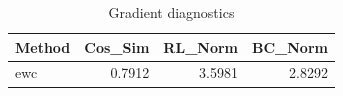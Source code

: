 \begin{table}[htbp]
\centering
\caption{Gradient diagnostics}
\label{tab:grad-diag}
\begin{tabular}{lrrr}
\toprule
\textbf{Method} & \textbf{Cos\_Sim} & \textbf{RL\_Norm} & \textbf{BC\_Norm} \\
\midrule
ewc & 0.7912 & 3.5981 & 2.8292 \\
\bottomrule
\end{tabular}
\end{table}